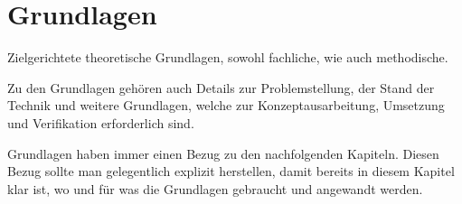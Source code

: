 \chapter{Grundlagen}
\label{cha:Grundlagen}

Zielgerichtete theoretische Grundlagen, sowohl fachliche, wie auch methodische.

Zu den Grundlagen gehören  auch Details zur Problemstellung, der Stand der Technik und weitere Grundlagen, welche zur Konzeptausarbeitung, Umsetzung und Verifikation erforderlich sind.

Grundlagen haben immer einen Bezug zu den nachfolgenden Kapiteln. Diesen Bezug sollte man gelegentlich explizit herstellen, damit bereits in diesem Kapitel klar ist, wo und für was die Grundlagen gebraucht und angewandt werden.